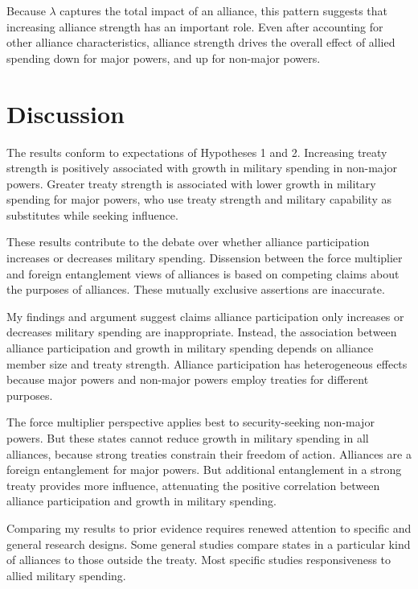 \documentclass[12pt]{article}
\begin{document}
Because $\lambda$ captures the total impact of an alliance, this pattern suggests that increasing alliance strength has an important role. 
Even after accounting for other alliance characteristics, alliance strength drives the overall effect of allied spending down for major powers, and up for non-major powers. 


\section{Discussion}


The results conform to expectations of Hypotheses 1 and 2. 
Increasing treaty strength is positively associated with growth in military spending in non-major powers. 
Greater treaty strength is associated with lower growth in military spending for major powers, who use treaty strength and military capability as substitutes while seeking influence. 


These results contribute to the debate over whether alliance participation increases or decreases military spending. 
Dissension between the force multiplier and foreign entanglement views of alliances is based on competing claims about the purposes of alliances. 
These mutually exclusive assertions are inaccurate. 


My findings and argument suggest claims alliance participation only increases or decreases military spending are inappropriate. 
Instead, the association between alliance participation and growth in military spending depends on alliance member size and treaty strength. 
Alliance participation has heterogeneous effects because major powers and non-major powers employ treaties for different purposes. 


The force multiplier perspective applies best to security-seeking non-major powers. 
But these states cannot reduce growth in military spending in all alliances, because strong treaties constrain their freedom of action.
Alliances are a foreign entanglement for major powers. 
But additional entanglement in a strong treaty provides more influence, attenuating the positive correlation between alliance participation and growth in military spending. 


Comparing my results to prior evidence requires renewed attention to specific and general research designs. 
Some general studies compare states in a particular kind of alliances to those outside the treaty. 
Most specific studies responsiveness to allied military spending. 
\end{document}
